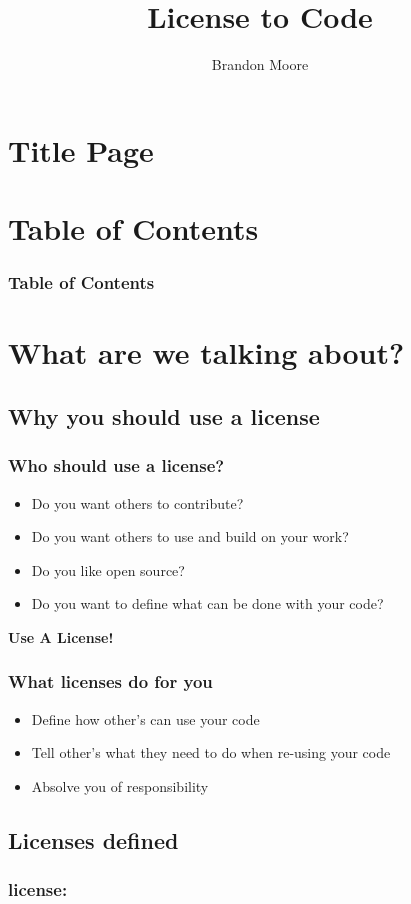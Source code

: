 \documentclass{beamer}
\begin{document}
	\title{License to Code}
	\author{Brandon Moore}
	\date{}
	\section{Title Page}
	\frame{\titlepage}
	\section{Table of Contents}
	\begin{frame}
		\frametitle{Table of Contents}
		\tableofcontents[]
	\end{frame}
	\section{What are we talking about?}
	\subsection{Why you should use a license}
	\begin{frame}
		\frametitle{Who should use a license?}
		\pause
		\begin{itemize}[<+->]
			\item Do you want others to contribute?
			\item Do you want others to use and build on your work?
			\item Do you like open source?
			\item Do you want to define what can be done with your code?
		\end{itemize}
		\pause
		\center\LARGE\textbf{Use A License!}
	\end{frame}
	\begin{frame}
		\frametitle{What licenses do for you}
		\begin{itemize}[<+->]
			\item Define how other's can use your code
			\item Tell other's what they need to do when re-using your code
			\item Absolve you of responsibility
		\end{itemize}
	\end{frame}
	\subsection{Licenses defined}
	\begin{frame}
		\frametitle{license:}
		
	\end{frame}
\end{document}
